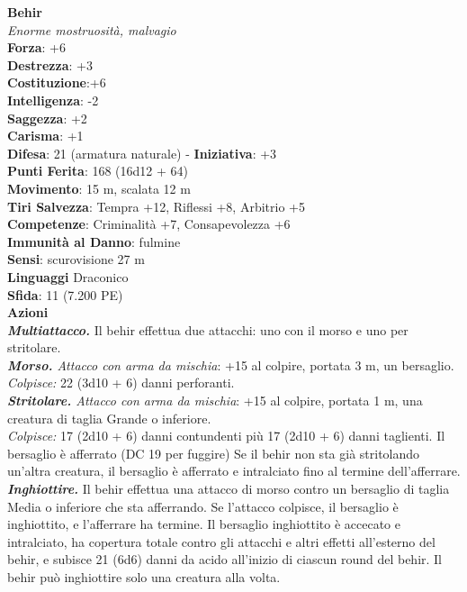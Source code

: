 \begin{multicols}{2}
\medskip\textbf{Behir}\\
\emph{Enorme mostruosità, malvagio}\\
\textbf{Forza}: +6\\
\textbf{Destrezza}: +3\\
\textbf{Costituzione}:+6\\
\textbf{Intelligenza}: -2\\
\textbf{Saggezza}: +2\\
\textbf{Carisma}: +1\\
\textbf{Difesa}: 21 (armatura naturale) - \textbf{Iniziativa}: +3\\
\textbf{Punti Ferita}: 168 (16d12 + 64)\\
\textbf{Movimento}: 15 m, scalata 12 m\\
\textbf{Tiri Salvezza}: Tempra +12, Riflessi +8, Arbitrio +5\\
\textbf{Competenze}: Criminalità +7, Consapevolezza +6\\
\textbf{Immunità al Danno}: fulmine\\
\textbf{Sensi}: scurovisione 27 m\\
\textbf{Linguaggi} Draconico\\
\textbf{Sfida}: 11 (7.200 PE)\smallskip\\
\smallskip\textbf{Azioni}\\
\emph{\textbf{Multiattacco.}} Il behir effettua due attacchi: uno con il morso e uno per stritolare.\\
\emph{\textbf{Morso.} Attacco con arma da mischia}: +15 al colpire, portata 3 m, un bersaglio.\\
\emph{Colpisce:} 22 (3d10 + 6) danni perforanti.\\
\emph{\textbf{Stritolare.} Attacco con arma da mischia}: +15 al colpire, portata 1 m, una creatura di taglia Grande o inferiore.\\
\emph{Colpisce:} 17 (2d10 + 6) danni contundenti più 17 (2d10 + 6) danni taglienti. Il bersaglio è afferrato (DC  19 per fuggire) Se il behir non sta già stritolando un'altra creatura, il bersaglio è afferrato e intralciato fino al termine dell'afferrare.\\
\emph{\textbf{Inghiottire.}} Il behir effettua una attacco di morso contro un bersaglio di taglia Media o inferiore che sta afferrando. Se l'attacco colpisce, il bersaglio è inghiottito, e l'afferrare ha termine. Il bersaglio inghiottito è accecato e intralciato, ha copertura totale contro gli attacchi e altri effetti all'esterno del behir, e subisce 21 (6d6) danni da acido all'inizio di ciascun round del behir. Il behir può inghiottire solo una creatura alla volta.\\

\end{multicols}
